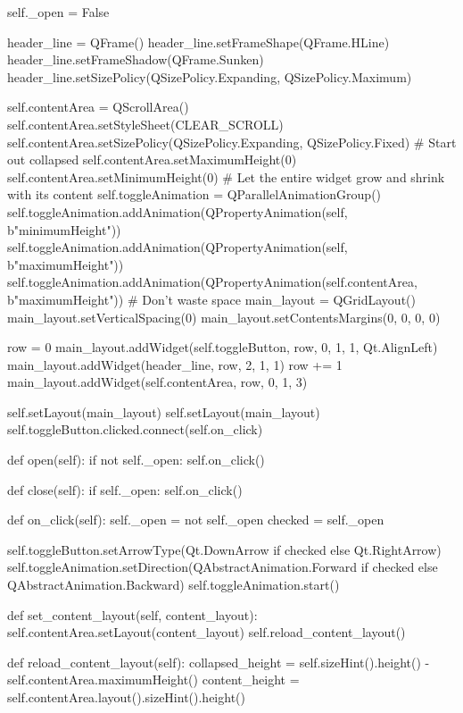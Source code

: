 \begin{pythoncode}
        self._open = False

        header_line = QFrame()
        header_line.setFrameShape(QFrame.HLine)
        header_line.setFrameShadow(QFrame.Sunken)
        header_line.setSizePolicy(QSizePolicy.Expanding, QSizePolicy.Maximum)

        self.contentArea = QScrollArea()
        self.contentArea.setStyleSheet(CLEAR_SCROLL)
        self.contentArea.setSizePolicy(QSizePolicy.Expanding, QSizePolicy.Fixed)
        # Start out collapsed
        self.contentArea.setMaximumHeight(0)
        self.contentArea.setMinimumHeight(0)
        # Let the entire widget grow and shrink with its content
        self.toggleAnimation = QParallelAnimationGroup()
        self.toggleAnimation.addAnimation(QPropertyAnimation(self, b"minimumHeight"))
        self.toggleAnimation.addAnimation(QPropertyAnimation(self, b"maximumHeight"))
        self.toggleAnimation.addAnimation(QPropertyAnimation(self.contentArea, b"maximumHeight"))
        # Don't waste space
        main_layout = QGridLayout()
        main_layout.setVerticalSpacing(0)
        main_layout.setContentsMargins(0, 0, 0, 0)

        row = 0
        main_layout.addWidget(self.toggleButton, row, 0, 1, 1, Qt.AlignLeft)
        main_layout.addWidget(header_line, row, 2, 1, 1)
        row += 1
        main_layout.addWidget(self.contentArea, row, 0, 1, 3)

        self.setLayout(main_layout)
        self.setLayout(main_layout)
        self.toggleButton.clicked.connect(self.on_click)

    def open(self):
        if not self._open:
            self.on_click()

    def close(self):
        if self._open:
            self.on_click()

    def on_click(self):
        self._open = not self._open
        checked = self._open

        self.toggleButton.setArrowType(Qt.DownArrow if checked else Qt.RightArrow)
        self.toggleAnimation.setDirection(QAbstractAnimation.Forward if checked else QAbstractAnimation.Backward)
        self.toggleAnimation.start()

    def set_content_layout(self, content_layout):
        self.contentArea.setLayout(content_layout)
        self.reload_content_layout()

    def reload_content_layout(self):
        collapsed_height = self.sizeHint().height() - self.contentArea.maximumHeight()
        content_height = self.contentArea.layout().sizeHint().height()


\end{pythoncode}
